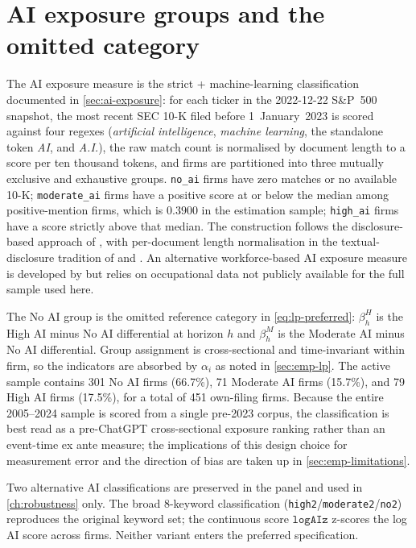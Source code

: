 \section{AI exposure groups and the omitted category}
\label{sec:emp-ai}

The AI exposure measure is the strict + machine-learning classification documented in \cref{sec:ai-exposure}: for each ticker in the 2022-12-22 S\&P~500 snapshot, the most recent SEC 10-K filed before 1~January~2023 is scored against four regexes (\textit{artificial intelligence}, \textit{machine learning}, the standalone token \textit{AI}, and \textit{A.I.}), the raw match count is normalised by document length to a score per ten thousand tokens, and firms are partitioned into three mutually exclusive and exhaustive groups. \texttt{no\_ai} firms have zero matches or no available 10-K; \texttt{moderate\_ai} firms have a positive score at or below the median among positive-mention firms, which is $0.3900$ in the estimation sample; \texttt{high\_ai} firms have a score strictly above that median. The construction follows the disclosure-based approach of \citet{anteSaggu2025}, with per-document length normalisation in the textual-disclosure tradition of \citet{loughranMcDonald2011} and \citet{hobergPhillips2016}. An alternative workforce-based AI exposure measure is developed by \citet{eisfeldtSchubertZhangTaska2023} but relies on occupational data not publicly available for the full sample used here.

The No AI group is the omitted reference category in \eqref{eq:lp-preferred}: $\beta_h^H$ is the High AI minus No AI differential at horizon $h$ and $\beta_h^M$ is the Moderate AI minus No AI differential. Group assignment is cross-sectional and time-invariant within firm, so the indicators are absorbed by $\alpha_i$ as noted in \cref{sec:emp-lp}. The active sample contains 301 No AI firms (66.7\%), 71 Moderate AI firms (15.7\%), and 79 High AI firms (17.5\%), for a total of 451 own-filing firms. Because the entire 2005--2024 sample is scored from a single pre-2023 corpus, the classification is best read as a pre-ChatGPT cross-sectional exposure ranking rather than an event-time ex ante measure; the implications of this design choice for measurement error and the direction of bias are taken up in \cref{sec:emp-limitations}.

Two alternative AI classifications are preserved in the panel and used in \cref{ch:robustness} only. The broad 8-keyword classification (\texttt{high2}/\texttt{moderate2}/\texttt{no2}) reproduces the original keyword set; the continuous score $\mathtt{logAIz}$ z-scores the log AI score across firms. Neither variant enters the preferred specification.

